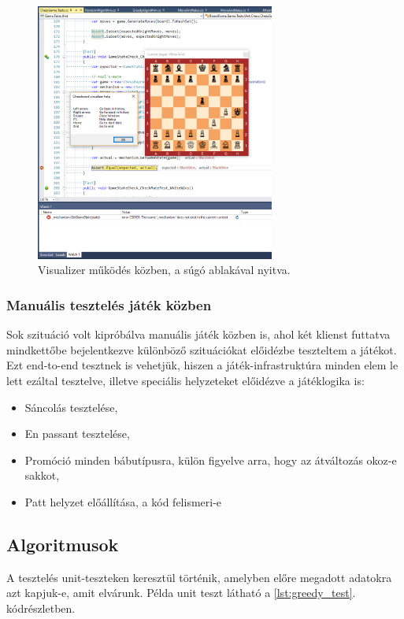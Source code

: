 \documentclass[twoside, a4paper, 12pt]{article}
\begin{document}
\begin{figure}[htbp]
	\centering
	\includegraphics[width=0.7\textwidth]{img/visualizer.png}
	\caption{Visualizer működés közben, a súgó ablakával nyitva.}
	\label{fig:visualizer}
\end{figure}

\subsubsection{Manuális tesztelés játék közben}
Sok szituáció volt kipróbálva manuális játék közben is, ahol két klienst futtatva mindkettőbe bejelentkezve különböző szituációkat előidézbe teszteltem a játékot. Ezt end-to-end tesztnek is vehetjük, hiszen a játék-infrastruktúra minden elem le lett ezáltal tesztelve, illetve speciális helyzeteket előidézve a játéklogika is:
\begin{itemize}
	\item Sáncolás tesztelése,
	\item En passant tesztelése,
	\item Promóció minden bábutípusra, külön figyelve arra, hogy az átváltozás okoz-e sakkot,
	\item Patt helyzet előállítása, a kód felismeri-e
\end{itemize}

\subsection{Algoritmusok}
A tesztelés unit-teszteken keresztül történik, amelyben előre megadott adatokra azt kapjuk-e, amit elvárunk. Példa unit teszt látható a \ref{lst:greedy_test}. kódrészletben.
\end{document}
